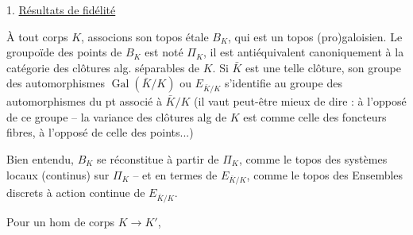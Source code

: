 {}


1. \uline{Résultats de fidélité}

À tout corps $K$, associons son topos étale $B_K$, qui est un topos (pro)galoisien. Le groupoïde des points de $B_K$ est noté $\Pi_K$, il est antiéquivalent canoniquement à la catégorie des clôtures alg. séparables de $K$. Si $\bar K$ est une telle clôture, son groupe des automorphismes $\operatorname{Gal}(\bar K/K)$ ou $E_{\bar K/K}$ s'identifie au groupe des automorphismes du pt  associé à $\bar K/K$ (il vaut peut-être mieux de dire : à l'opposé de ce groupe --  la variance des clôtures alg de $K$ est comme celle des foncteurs fibres, à l'opposé de celle des points...)

Bien entendu, $B_K$ se réconstitue à partir de $\Pi_K$, comme le topos des systèmes locaux (continus) sur $\Pi_K$ -- et en termes de $E_{\bar K/K}$, comme le topos des Ensembles discrets à action continue de $E_{\bar K/K}$.

Pour un hom de corps $K\longrightarrow K'$,

